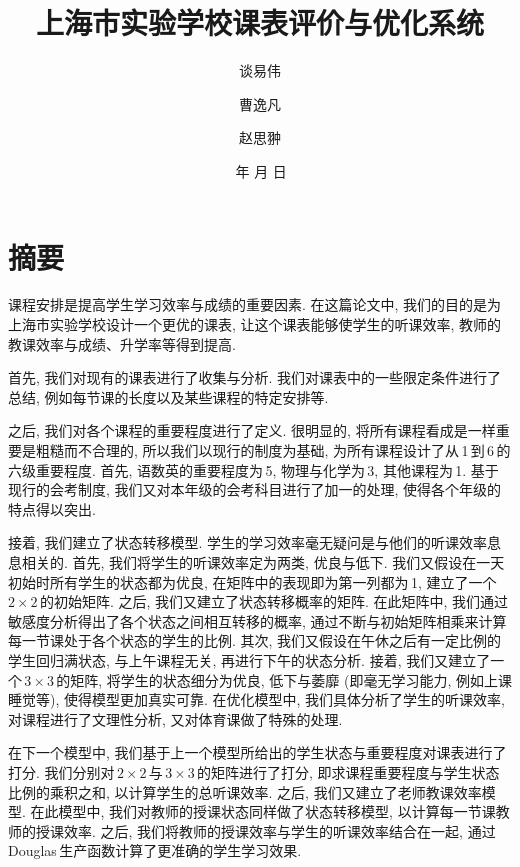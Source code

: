 \documentclass[a4paper]{article}
\begin{document}
\title{\bf 上海市实验学校课表评价与优化系统}
\author{谈易伟\and 曹逸凡\and 赵思翀}
\date{\number\year\,年\,\number\month\,月\,\number\day\,日}
\maketitle
\thispagestyle{empty}
\section*{\hfil 摘\quad 要}
 课程安排是提高学生学习效率与成绩的重要因素. 在这篇论文中, 我们的目的是为上海市实验学校设计一个更优的课表, 让这个课表能够使学生的听课效率, 教师的教课效率与成绩、升学率等得到提高.\par
 首先, 我们对现有的课表进行了收集与分析. 我们对课表中的一些限定条件进行了总结, 例如每节课的长度以及某些课程的特定安排等.\par
 之后, 我们对各个课程的重要程度进行了定义. 很明显的, 将所有课程看成是一样重要是粗糙而不合理的, 所以我们以现行的制度为基础, 为所有课程设计了从\,1\,到\,6\,的六级重要程度. 首先, 语数英的重要程度为\,5, 物理与化学为\,3, 其他课程为\,1. 基于现行的会考制度, 我们又对本年级的会考科目进行了加一的处理, 使得各个年级的特点得以突出.\par
 接着, 我们建立了状态转移模型. 学生的学习效率毫无疑问是与他们的听课效率息息相关的. 首先, 我们将学生的听课效率定为两类, 优良与低下. 我们又假设在一天初始时所有学生的状态都为优良, 在矩阵中的表现即为第一列都为\,1, 建立了一个\,$2\times2$\,的初始矩阵. 之后, 我们又建立了状态转移概率的矩阵. 在此矩阵中, 我们通过敏感度分析得出了各个状态之间相互转移的概率, 通过不断与初始矩阵相乘来计算每一节课处于各个状态的学生的比例. 其次, 我们又假设在午休之后有一定比例的学生回归满状态, 与上午课程无关, 再进行下午的状态分析. 接着, 我们又建立了一个\,$3\times3$\,的矩阵, 将学生的状态细分为优良, 低下与萎靡 (即毫无学习能力, 例如上课睡觉等), 使得模型更加真实可靠. 在优化模型中, 我们具体分析了学生的听课效率, 对课程进行了文理性分析, 又对体育课做了特殊的处理.\par
 在下一个模型中, 我们基于上一个模型所给出的学生状态与重要程度对课表进行了打分. 我们分别对\,$2\times2$\,与\,$3\times3$\,的矩阵进行了打分, 即求课程重要程度与学生状态比例的乘积之和, 以计算学生的总听课效率. 之后, 我们又建立了老师教课效率模型. 在此模型中, 我们对教师的授课状态同样做了状态转移模型, 以计算每一节课教师的授课效率. 之后, 我们将教师的授课效率与学生的听课效率结合在一起, 通过\,Douglas\,生产函数计算了更准确的学生学习效果.\par
\end{document}
